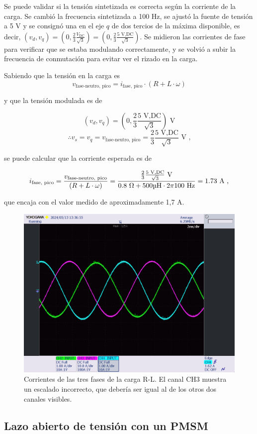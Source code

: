 Se puede validar si la tensión sintetizada es correcta según la corriente de la carga. Se cambió la frecuencia sintetizada a 100 Hz, se ajustó la fuente de tensión a 5 V y se consignó una en el eje $q$ de dos tercios de la máxima disponible, es decir, $(v_d, v_q) = (0, \frac{2}{3}\frac{V_{\text{DC}}}{\sqrt{3}}) = (0, \frac{2}{3}\frac{5 \text{ V,DC}}{\sqrt{3}})$. Se midieron las corrientes de fase para verificar que se estaba modulando correctamente, y se volvió a subir la frecuencia de conmutación para evitar ver el rizado en la carga.

Sabiendo que la tensión en la carga es
\[
v_{\text{fase-neutro, pico}} = i_{\text{fase, pico}}\cdot (R + L\cdot\omega)
\]

y que la tensión modulada es de 

\[ (v_d, v_q) = (0, \frac{2}{3}\frac{5 \text{ V,DC}}{\sqrt{3}}) \text{ V}\]
\[ \therefore v_s = v_q = v_{\text{fase-neutro, pico}} = \frac{2}{3}\frac{5 \text{ V,DC}}{\sqrt{3}} \text{ V ,}\]

se puede calcular que la corriente esperada es de

\[
i_{\text{fase, pico}} = \frac{v_{\text{fase-neutro, pico}}}{(R + L\cdot\omega)} = \frac{\frac{2}{3}\frac{5 \text{ V,DC}}{\sqrt{3}} \text{ V}}{0.8 \text{ }\Omega + 500 \text{\unit{\micro\henry}} \cdot 2\pi100 \text{ Hz}} = 1.73 \text{ A ,}
\]

que encaja con el valor medido de aproximadamente 1,7 A.


\begin{figure}[H]
	\centering
	\includegraphics[width=0.7\linewidth]{fig/3RLcurrent}
	\caption{Corrientes de las tres fases de la carga R-L. El canal CH3 muestra un escalado incorrecto, que debería ser igual al de los otros dos canales visibles.}
\end{figure}

\subsection{Lazo abierto de tensión con un PMSM}

